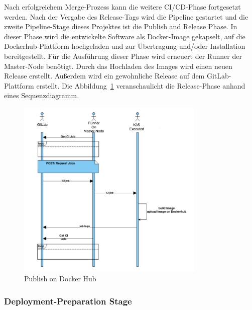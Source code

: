 Nach erfolgreichem Merge-Prozess kann die weitere \ac{CI/CD}-Phase fortgesetzt werden. Nach der Vergabe des Release-Tags wird die Pipeline gestartet und die zweite Pipeline-Stage dieses Projektes ist die \glqq Publish and Release Phase\grqq. In dieser Phase wird die entwickelte Software als Docker-Image gekapselt, auf die Dockerhub-Plattform hochgeladen und zur Übertragung und/oder Installation bereitgestellt. Für die Ausführung dieser Phase wird erneuert der Runner der Master-Node benötigt. Durch das Hochladen des Images wird einen neuen Release erstellt. Außerdem wird ein gewohnliche Release auf dem GitLab-Plattform erstellt. Die Abbildung~\ref{fig:release-stage} veranschaulicht die Release-Phase anhand eines Sequenzdiagramm.
\pagebreak
\begin{figure}[bth] 
	\centering
	\includegraphics[width=0.8\textwidth]{Graphics/release.png}
	\caption{Publish on Docker Hub}
	\label{fig:release-stage}
\end{figure}


\subsubsection*{Deployment-Preparation Stage}

